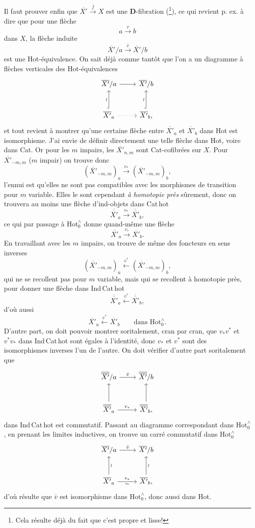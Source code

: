 \documentclass[11pt]{article}
\newcommand{\printedpage}[1]{\marginpar{\footnotesize p.~#1}}
\newcommand{\msp}[1]{\marginpar{\footnotesize [#1]}}
\newcommand{\Hotz}{\mathrm{Hot}^{\wedge}_{0}}
\newcommand{\Xb}{\overline{X'}}
\newcommand{\Xbb}{\overline{\overline{X'}}}
\begin{document}
\msp{page 154}
Il faut prouver enfin que $\Xb \xrightarrow{\bar f} X$ est une \textbf{D}-fibration (\footnote[39]{Cela résulte déjà du fait que c'est propre et lisse!}), ce qui revient p. ex. à dire que pour une flèche
\[
a \xrightarrow{v} b
\]
dans $X$, la flèche induite
\[
\Xb/a \xrightarrow{\bar v} \Xb/b
\]
est une Hot-équivalence. On sait déjà comme tantôt que l'on a un diagramme à flèches verticales des Hot-équivalences
\[
\begin{tikzcd}[row sep=large]
\Xb/a \arrow[r] & \Xb/b \\
\Xb_a \arrow[u, hook, "\wr"] \arrow[r, dotted] & \Xb_b, \arrow[u, hook, "\wr"]
\end{tikzcd}
\]
et tout revient à montrer qu'une certaine flèche entre $\Xb_a$ et $\Xb_b$ dans Hot est isomorphisme. J'ai envie de définir directement une telle flèche dans Hot, voire dans Cat. Or pour les $m$ impairs, les $\Xb_{n,m}$ sont Cat-cofibrées sur $X$. Pour $\Xb_{-m,m}$ ($m$ impair) on trouve donc
\[
(\Xb_{-m,m})_a \xrightarrow{v_*} (\Xb_{-m,m})_b,
\]
\msp{page 155}
l'ennui est qu'elles ne sont pas compatibles avec les morphismes de transition pour $m$ variable. Elles le sont cependant \textit{à homotopie près} sûrement, donc on trouvera au moins une flèche d'ind-objets dans Cat\,hot
\[
\Xbb_a \xrightarrow{v_*} \Xbb_b,
\]
ce qui par passage à $\Hotz$ donne quand-même une flèche
\[
\Xb_a \xrightarrow{v_*} \Xb_b.
\]
En travaillant avec les $m$ impairs, on trouve de même des foncteurs en sens inverses %
\[
(\Xb_{-m,m})_a \xleftarrow{v^*} (\Xb_{-m,m})_b,
\]
\printedpage{97}
qui ne se recollent pas pour $m$ variable, mais qui se recollent à homotopie près, pour donner une flèche dans Ind\,Cat\,hot
\[
\Xbb_a \xleftarrow{v^*} \Xbb_b,
\]
d'où aussi
\[
\Xb_a \xleftarrow{v^*} \Xb_b \qquad \text{dans } \Hotz.
\]
D'autre part, on doit pouvoir montrer soritalement,
\msp{page 156}
cran par cran, que $v_*v^*$ et $v^*v_*$ dans Ind\,Cat\,hot sont égales à l'identité, donc $v_*$ et $v^*$ sont des isomorphismes inverses l'un de l'autre. On doit vérifier d'autre part soritalement que
\[
\begin{tikzcd}[row sep=large]
\Xbb/a \arrow[r, "\bar v"] & \Xbb/b \\
\Xbb_a \arrow[u] \arrow[r, "v_*"] & \Xbb_b, \arrow[u]
\end{tikzcd}
\]
dans Ind\,Cat\,hot est commutatif. Passant au diagramme correspondant dans $\Hotz$, en prenant les limites inductives, on trouve un carré commutatif dans $\Hotz$
\[
\begin{tikzcd}[row sep=large]
\Xb/a \arrow[r, "\bar v"] & \Xb/b \\
\Xb_a \arrow[u, "\wr"'] \arrow[r, "v_*", "\sim"'] & \Xb_b, \arrow[u, "\wr"']
\end{tikzcd}
\]
d'où résulte que $\bar v$ est isomorphisme dans $\Hotz$, donc aussi dans Hot.
\end{document}
